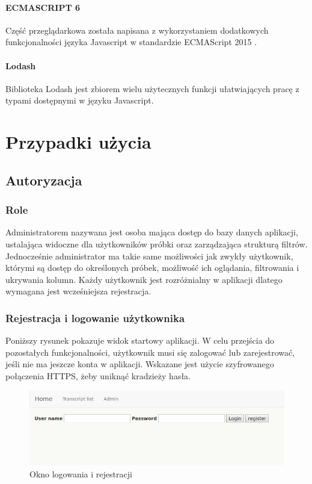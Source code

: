 \documentclass[a4paper,12pt,twoside]{article}
\begin{document}
\paragraph{ECMASCRIPT 6} Część przeglądarkowa została napisana z wykorzystaniem
dodatkowych funkcjonalności języka Javascript w standardzie ECMAScript 2015 \cite{ecma}. 
  
\paragraph{Lodash} Biblioteka Lodash \cite{lodash} jest zbiorem wielu użytecznych funkcji ułatwiających pracę z typami dostępnymi w języku Javascript. 
  
\newpage
\section{Przypadki użycia}
\subsection{Autoryzacja} 
\subsubsection{Role}
Administratorem nazywana jest osoba mająca dostęp do bazy danych aplikacji, ustalająca
widoczne dla użytkowników próbki oraz zarządzająca strukturą filtrów. 
Jednocześnie administrator ma takie same możliwości jak zwykły użytkownik, którymi są dostęp do określonych próbek, możliwość ich oglądania, filtrowania i  ukrywania kolumn. 
Każdy użytkownik jest rozróżnialny w aplikacji dlatego wymagana jest wcześniejsza rejestracja.
 
\subsubsection{Rejestracja i logowanie użytkownika}
Poniższy rysunek pokazuje widok startowy aplikacji. W celu przejścia do 
pozostałych funkcjonalności, użytkownik musi się zalogować lub zarejestrować, jeśli nie ma jeszcze 
konta w aplikacji. Wskazane jest użycie szyfrowanego połączenia HTTPS, żeby uniknąć 
kradzieży hasła.

\begin{figure}[h!]
  \includegraphics[width=\linewidth]{obrazy/aplikacja/login.png}
  \caption{Okno logowania i rejestracji}
  \label{fig:loginpic}
\end{figure}
\end{document}
